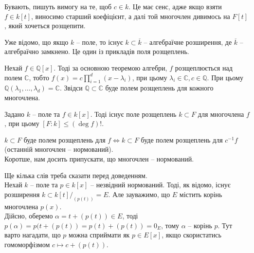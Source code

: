 \documentclass{math_library}
\begin{document}
\begin{remark}
Бувають, пишуть вимогу на те, щоб $c \in k$. Це має сенс, адже якщо взяти $f \in k[t]$, виносимо старший коефіцієнт, а далі той многочлен дивимось на $F[t]$, який хочеться розщепити.
\end{remark}

Уже відомо, що якщо $k$ -- поле, то існує $k \subset \overline{k}$ -- алгебраїчне розширення, де $\overline{k}$ -- алгебраїчно замкнено. Це один із прикладів поля розщеплень. 

\begin{example}
Нехай $f \in \mathbb{Q}[x]$. Тоді за основною теоремою алгебри, $f$ розщеплюється над полем $\mathbb{C}$, тобто $f(x) = c \displaystyle\prod_{i=1}^d (x-\lambda_i)$, при цьому $\lambda_i \in \mathbb{C}, c \in \mathbb{Q}$. При цьому $\mathbb{Q}(\lambda_1,\dots,\lambda_d) = \mathbb{C}$. Звідси $\mathbb{Q} \subset \mathbb{C}$ буде полем розщеплень для кожного многочлена.
\end{example}

\begin{theorem}
Задано $k$ -- поле та $f \in k[x]$. Тоді існує поле розщеплень $k \subset F$ для многочлена $f$, при цьому $[F:k] \leq (\deg f)!$.
\end{theorem}

\begin{remark}
$k \subset F$ буде полем розщеплень для $f \iff k \subset F$ буде полем розщеплень для $c^{-1}f$ (останній многочлен -- нормований).\\
Коротше, нам досить припускати, що многочлен -- нормований.
\end{remark}

Ще кілька слів треба сказати перед доведенням.\\
Нехай $k$ -- поле та $p \in k[x]$ -- незвідний нормований. Тоді, як відомо, існує розширення $k \subset k[t]/_{(p(t))} = E$. Але зауважимо, що $E$ містить корінь многочлена $p(x)$.
\bigskip \\
Дійсно, оберемо $\alpha = t + (p(t)) \in E$, тоді $p(\alpha) = p(t+(p(t)) = p(t) + (p(t)) = 0_E$, тому $\alpha$ -- корінь $p$. Тут варто нагадати, що $p$ можна сприймати як $p \in E[x]$, якщо скористатись гомоморфізмом $c \mapsto c + (p(t))$.
\end{document}
